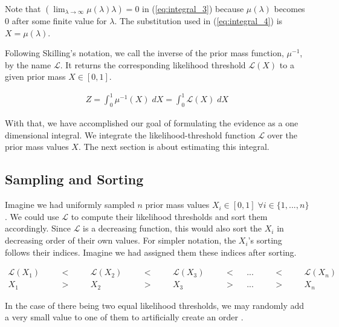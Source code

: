 \documentclass[12pt, a4paper]{report}
\begin{document}
Note that $\left(\lim_{\lambda \rightarrow \infty} \mu(\lambda) \lambda\right) = 0$ in (\ref{eq:integral_3}) because $\mu(\lambda)$ becomes $0$ after some finite value for $\lambda$.
The substitution used in (\ref{eq:integral_4}) is $X = \mu(\lambda)$.

Following Skilling's notation, we call the inverse of the prior mass function, $\mu^{-1}$, by the name $\mathcal{L}$.
It returns the corresponding likelihood threshold $\mathcal{L}(X)$ to a given prior mass $X \in [0,1]$.

\begin{align}
    Z = \int_0^1 \mu^{-1}(X) \; dX = \int_0^1 \mathcal{L}(X) \; dX
    \label{eq:integral_5}
\end{align}

With that, we have accomplished our goal of formulating the evidence as a one dimensional integral.
We integrate the likelihood-threshold function $\mathcal{L}$ over the prior mass values $X$.
The next section is about estimating this integral. 


\FloatBarrier
\subsection{Sampling and Sorting}

Imagine we had uniformly sampled $n$ prior mass values $X_i \in [0,1] \; \forall i \in \{1, ..., n\}$.
We could use $\mathcal{L}$ to compute their likelihood thresholds and sort them accordingly.
Since $\mathcal{L}$ is a decreasing function, this would also sort the $X_i$ in decreasing order of their own values.
For simpler notation, the $X_i$'s sorting follows their indices.
Imagine we had assigned them these indices after sorting.

\begin{align}
    \mathcal{L}(X_1)& &<& &\mathcal{L}(X_2)& &<& &\mathcal{L}(X_3) &\quad&<&   &...& &<& &\mathcal{L}(X_n) \nonumber\\
    X_1 & \quad &>& \quad &X_2 & \quad &>& \quad &X_3 &\quad&>& &...& \quad &>& \quad &X_n \label{eq:sample_ordering}
\end{align}

In the case of there being two equal likelihood thresholds, we may randomly add a very small value to one of them to artificially create an order \cite[3]{skilling}.
\end{document}

